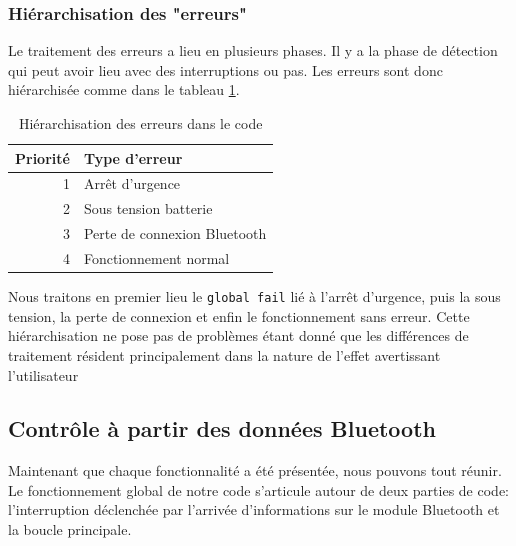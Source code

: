 				\subsubsection{Hiérarchisation des "erreurs"}
				Le traitement des erreurs a lieu en plusieurs phases. Il y a la phase de détection qui peut avoir lieu avec des interruptions ou pas. Les erreurs sont donc hiérarchisée comme dans le tableau \ref{hierar}.\\
				\begin{table}[hb]
				\begin{center}
					\begin{tabular}{r|l}
					Priorité&Type d'erreur\\
					\hline
					 1 & Arrêt d'urgence 	\\ 
					 2 & Sous tension batterie 	\\ 
					 3 & Perte de connexion Bluetooth	\\
					 4 & Fonctionnement normal	\\
					\end{tabular} 
					\caption{Hiérarchisation des erreurs dans le code}
					\label{hierar}
					\end{center}
				\end{table}
				Nous traitons en premier lieu le \texttt{global fail} lié à l'arrêt d'urgence, puis la sous tension, la perte de connexion et enfin le fonctionnement sans erreur. Cette hiérarchisation ne pose pas de problèmes étant donné que les différences de traitement résident principalement dans la nature de l'effet avertissant l'utilisateur
			\subsection{Contrôle à partir des données Bluetooth}
			Maintenant que chaque fonctionnalité a été présentée, nous pouvons tout réunir. Le fonctionnement global de notre code s'articule autour de deux parties de code: l'interruption déclenchée par l'arrivée d'informations sur le module Bluetooth et la boucle principale.
